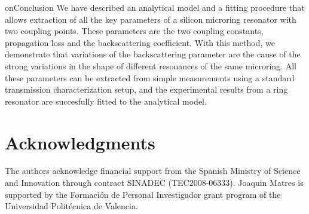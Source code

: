 \documentclass[10pt,letterpaper]{article}
\begin{document}
on{Conclusion}
We have described an analytical model and a fitting procedure that allows extraction of all the key parameters of a silicon microring resonator with two coupling points. These parameters are the two coupling constants, propagation loss and the backscattering coefficient. With this method, we demonstrate that variations of the backscattering  parameter are the cause of the strong variations in the shape of different resonances of the same microring. All these parameters can be extracted from simple measurements using a standard transmission characterization setup, and the experimental results from a ring resonator are succesfully fitted to the analytical model.


\section*{Acknowledgments}


The authors acknowledge financial support from the Spanish Ministry of Science and Innovation through contract SINADEC (TEC2008-06333). Joaquin Matres is supported by the Formaci\'on de Personal Investigador grant program of the Universidad Polit\'ecnica de Valencia.
\end{document}

